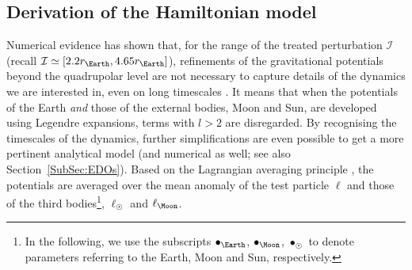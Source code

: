 \documentclass{amsart}
\theoremstyle{definition}
\theoremstyle{remark}
\numberwithin{equation}{section}
\begin{document}
\subsection{Derivation of the Hamiltonian model}\label{subset:model} 
Numerical evidence has shown that, for the range of the treated perturbation $\mathcal{I}$ ({\color{black}recall $\mathcal{I}\simeq[2.2 r_{\Earth},4.65 r_{\Earth}]$}), refinements of the gravitational potentials beyond the quadrupolar level are not necessary to capture details of the {\color{black}{\it global}} dynamics we are interested in, even on {\color{black}long timescales} \citep{jDa16}. It means that when the potentials of the Earth \textit{and} those of the external bodies, Moon and Sun, are developed using Legendre expansions, terms with $l > 2$ are disregarded.  By recognising the timescales of the dynamics, further simplifications are even possible to get a {\color{black}more} pertinent analytical model (and numerical as well; see also Section~\ref{SubSec:EDOs}). Based on the Lagrangian averaging principle \citep{eGr65,iMi67,eGh07}, the potentials are averaged over the mean anomaly of the {\color{black}test particle} $\ell$ and those of the {\color{black}third bodies}\footnote{{\color{black}
In the following, we use the subscripts $\bullet_\Earth$, $\bullet_\Moon$, $\bullet_\Sun$ to denote {\color{black}parameters} referring
to the Earth, Moon and {\color{black}Sun, respectively}.
}},
$\ell_{\Sun}$ and $\ell_{\Moon}$. 
\end{document}
